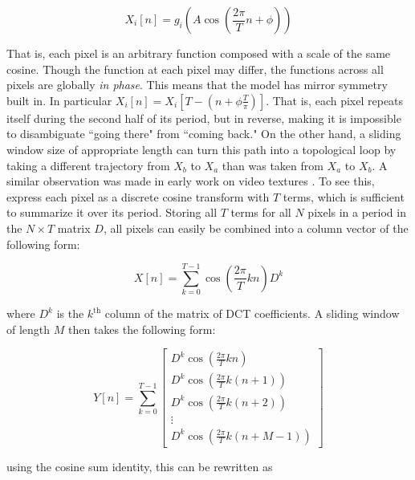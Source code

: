 \documentclass[a4paper,UKenglish]{lipics}
\begin{document}
\begin{equation}
X_i[n] = g_i \left( A \cos \left( \frac{2 \pi}{T} n + \phi \right) \right)
\end{equation}

That is, each pixel is an arbitrary function composed with a scale of the same cosine.  Though the function at each pixel may differ, the functions across all pixels are globally {\em in phase}.  This means that the model has mirror symmetry built in.  In particular $X_i[n] = X_i\left[ T - \left(n + \phi \frac{T}{\pi} \right) \right]$.  That is, each pixel repeats itself during the second half of its period, but in reverse, making it is impossible to disambiguate ``going there" from ``coming back."  On the other hand, a sliding window size of appropriate length can turn this path into a topological loop by taking a different trajectory from $X_b$ to $X_a$ than was taken from $X_a$ to $X_b$.  A similar observation was made in early work on video textures \cite{schodl2000video}.  To see this, express each pixel as a discrete cosine transform with $T$ terms, which is sufficient to summarize it over its period.  Storing all $T$ terms for all $N$ pixels in a period in the $N \times T$ matrix $D$,  all pixels can easily be combined into a column vector of the following form:



\begin{equation}
\label{eq:rawexpansion}
X[n] = \sum_{k = 0}^{T-1} \cos \left( \frac{2 \pi}{T} k n \right) D^k
\end{equation}

where $D^k$ is the $k^{\text{th}}$ column of the matrix of DCT coefficients.  A sliding window of length $M$ then takes the following form:

\begin{equation}
Y[n] = \sum_{k = 0}^{T-1} \left[ \begin{array}{c} D^k \cos \left( \frac{2 \pi}{T} k n \right)  \\ D^k \cos \left( \frac{2 \pi}{T} k (n+1) \right) \\ D^k \cos \left( \frac{2 \pi}{T} k (n+2) \right) \\  \vdots \\ D^k \cos \left( \frac{2 \pi}{T} k (n+M-1) \right) \end{array} \right] 
\end{equation}


using the cosine sum identity, this can be rewritten as
\end{document}
